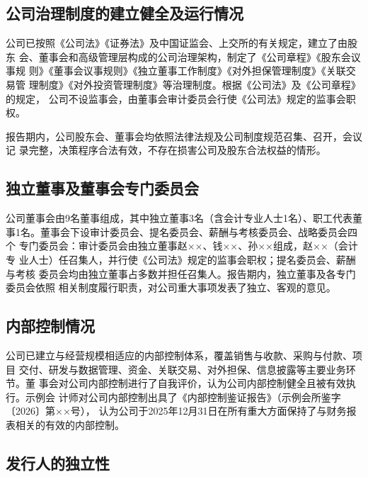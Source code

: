 
\subsection{公司治理制度的建立健全及运行情况}

公司已按照《公司法》《证券法》及中国证监会、上交所的有关规定，建立了由股东
会、董事会和高级管理层构成的公司治理架构，制定了《公司章程》《股东会议事规
则》《董事会议事规则》《独立董事工作制度》《对外担保管理制度》《关联交易管
理制度》《对外投资管理制度》等治理制度。根据《公司法》及《公司章程》的规定，
公司不设监事会，由董事会审计委员会行使《公司法》规定的监事会职权。

报告期内，公司股东会、董事会均依照法律法规及公司制度规范召集、召开，会议记
录完整，决策程序合法有效，不存在损害公司及股东合法权益的情形。

\subsection{独立董事及董事会专门委员会}

公司董事会由9名董事组成，其中独立董事3名（含会计专业人士1名）、职工代表董
事1名。董事会下设审计委员会、提名委员会、薪酬与考核委员会、战略委员会四个
专门委员会：审计委员会由独立董事赵××、钱××、孙××组成，赵××（会计专
业人士）任召集人，并行使《公司法》规定的监事会职权；提名委员会、薪酬与考核
委员会均由独立董事占多数并担任召集人。报告期内，独立董事及各专门委员会依照
相关制度履行职责，对公司重大事项发表了独立、客观的意见。

\subsection{内部控制情况}

公司已建立与经营规模相适应的内部控制体系，覆盖销售与收款、采购与付款、项目
交付、研发与数据管理、资金、关联交易、对外担保、信息披露等主要业务环节。董
事会对公司内部控制进行了自我评价，认为公司内部控制健全且被有效执行。示例会
计师对公司内部控制出具了《内部控制鉴证报告》（示例会所鉴字〔2026〕第××号），
认为公司于2025年12月31日在所有重大方面保持了与财务报表相关的有效的内部控制。

\subsection{发行人的独立性}

